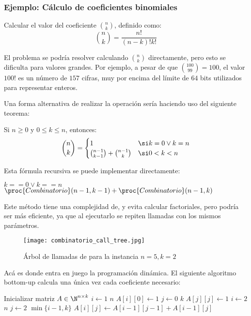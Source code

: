 \subsubsection{Ejemplo: Cálculo de coeficientes binomiales}

\begin{problema}
    Calcular el valor del coeficiente $\binom{n}{k}$, definido como:
    $$\binom{n}{k} = \frac{n!}{(n-k)!k!}$$
\end{problema}

El problema se podría resolver calculando $\binom{n}{k}$ directamente, pero esto se dificulta para valores grandes. Por ejemplo, a pesar de que $\binom{100}{99} = 100$, el valor $100!$ es un número de $157$ cifras, muy por encima del límite de $64$ bits utilizados para representar enteros.

Una forma alternativa de realizar la operación sería haciendo uso del siguiente teorema:

\begin{theorem*}
    Si $n \geq 0$ y $0 \leq k \leq n$, entonces:
    $$
        \binom{n}{k} =
        \begin{cases}
            1                                       & \si k = 0 \lor k = n \\
            \binom{n - 1}{k - 1} + \binom{n - 1}{k} & \si 0 < k < n
        \end{cases}
    $$
\end{theorem*}

Esta fórmula recursiva se puede implementar directamente:
\begin{codebox}
    \li \If $k == 0 \lor k == n$ \Then
    \li {}
    \li \Else
    \li \Return $\proc{Combinatorio}(n-1,k-1) + \proc{Combinatorio}(n-1,k)$
    \End
\end{codebox}

Este método tiene una complejidad de, y evita calcular factoriales, pero podría ser más eficiente, ya que al ejecutarlo se repiten llamadas con los mismos parámetros.
\begin{figure}[H]
    \centering
    \texttt{[image: combinatorio\_call\_tree.jpg]}
    \caption*{Árbol de llamadas de  para la instancia $n=5, k=2$}
\end{figure}

Acá es donde entra en juego la programación dinámica. El siguiente algoritmo bottom-up calcula una única vez cada coeficiente necesario:
\begin{codebox}
    \li Inicializar matriz $A \in \N^{n \times k}$
    \li \For $i \gets 1$ \To $n$ \Do
    \li $A[i][0] \gets 1$
    \End
    \li \For $j \gets 0$ \To $k$ \Do
    \li $A[j][j] \gets 1$
    \End
    \li \For $i \gets 2$ \To $n$ \Do
    \li \For $j \gets 2$ \To $\min{\{i - 1, k\}}$ \Do
    \li $A[i][j] \gets A[i - 1][j - 1] + A[i - 1][j]$
    \End
    \End
\end{codebox}

